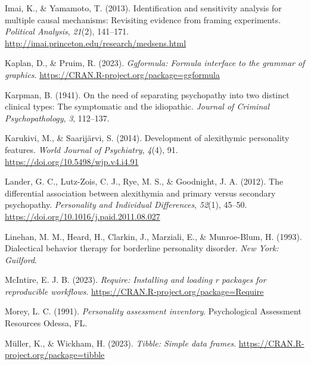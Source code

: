 \documentclass[
  man,floatsintext]{apa7}
\newlength{\cslhangindent}
\newlength{\cslentryspacingunit} %
\newenvironment{CSLReferences}[2] %
 {%
  \setlength{\parindent}{0pt}
  \ifodd #1
  \let\oldpar\par
  \def\par{\hangindent=\cslhangindent\oldpar}
  \fi
  \setlength{\parskip}{#2\cslentryspacingunit}
 }%
 {}
\begin{document}
\begin{CSLReferences}{1}{0}
\leavevmode{}%
Imai, K., \& Yamamoto, T. (2013). Identification and sensitivity analysis for multiple causal mechanisms: Revisiting evidence from framing experiments. \emph{Political Analysis}, \emph{21}(2), 141--171. \url{http://imai.princeton.edu/research/medsens.html}

\leavevmode{}%
Kaplan, D., \& Pruim, R. (2023). \emph{Ggformula: Formula interface to the grammar of graphics}. \url{https://CRAN.R-project.org/package=ggformula}

\leavevmode{}%
Karpman, B. (1941). On the need of separating psychopathy into two distinct clinical types: The symptomatic and the idiopathic. \emph{Journal of Criminal Psychopathology}, \emph{3}, 112--137.

\leavevmode{}%
Karukivi, M., \& Saarijärvi, S. (2014). Development of alexithymic personality features. \emph{World Journal of Psychiatry}, \emph{4}(4), 91. \url{https://doi.org/10.5498/wjp.v4.i4.91}

\leavevmode{}%
Lander, G. C., Lutz-Zois, C. J., Rye, M. S., \& Goodnight, J. A. (2012). The differential association between alexithymia and primary versus secondary psychopathy. \emph{Personality and Individual Differences}, \emph{52}(1), 45--50. \url{https://doi.org/10.1016/j.paid.2011.08.027}

\leavevmode{}%
Linehan, M. M., Heard, H., Clarkin, J., Marziali, E., \& Munroe-Blum, H. (1993). Dialectical behavior therapy for borderline personality disorder. \emph{New York: Guilford}.

\leavevmode{}%
McIntire, E. J. B. (2023). \emph{Require: Installing and loading r packages for reproducible workflows}. \url{https://CRAN.R-project.org/package=Require}

\leavevmode{}%
Morey, L. C. (1991). \emph{Personality assessment inventory}. Psychological Assessment Resources Odessa, FL.

\leavevmode{}%
Müller, K., \& Wickham, H. (2023). \emph{Tibble: Simple data frames}. \url{https://CRAN.R-project.org/package=tibble}


\end{CSLReferences}
\end{document}
